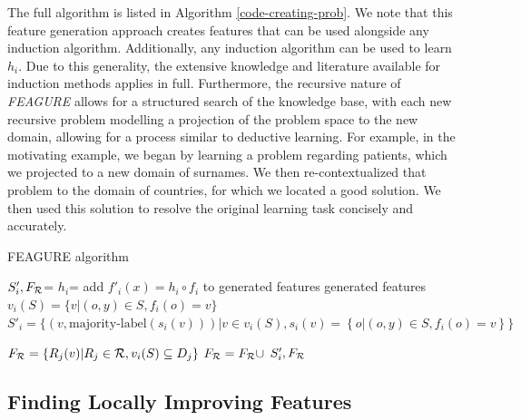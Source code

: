 \documentclass[twoside,11pt]{article}
\theoremstyle{definition}
\begin{document}
The full algorithm is listed in Algorithm \ref{code-creating-prob}.
We note that this feature generation approach creates features that can be used alongside any induction algorithm. Additionally, any induction algorithm can be used to learn $h_i$. Due to this generality, the extensive knowledge and literature available for induction methods applies in full. Furthermore, the recursive nature of \emph{FEAGURE} allows for a structured search of the knowledge base, with each new recursive problem modelling a projection of the problem space to the new domain, allowing for a process similar to deductive learning. For example, in the motivating example, we began by learning a problem regarding patients, which we projected to a new domain of surnames. We then re-contextualized that problem to the domain of countries, for which we located a good solution. We then used this solution to resolve the original learning task concisely and accurately.

\begin{algorithm}[H]
	\caption{FEAGURE algorithm}
	\label{code-creating-prob}
	\small
	\begin{algorithmic}
		\State $S'_i,F_{\cal R}$=  %
		\State $h_i$=  
		\State add $f'_i(x)=h_i\circ f_i$ to generated features
		\EndFor
		\State \Return generated features
		\EndFunction
		\State 
		\State $v_i(S) = \{v | (o,y) \in S, f_{i}(o)=v\}$
		\State		$S'_i =  \{ (v, \mbox{majority-label}(s_i(v))) | v \in v_i(S),		 s_i(v)=\left \{o | (o,y)\in S, f_{i}(o)=v \right \}  \} $
		
		
		\State $F_{\cal R}=\{R_j(v)| R_j\in{\cal R}, v_i(S)\subseteq D_j\}$
		\State $F_{\cal R}=F_{\cal R}\cup$
		\EndIf
		\State \Return $S'_i, F_{\cal R}$ 
		\EndFunction
		
	\end{algorithmic}
\end{algorithm}

\subsection{Finding Locally Improving Features} \label{tree_usage}
\end{document}
